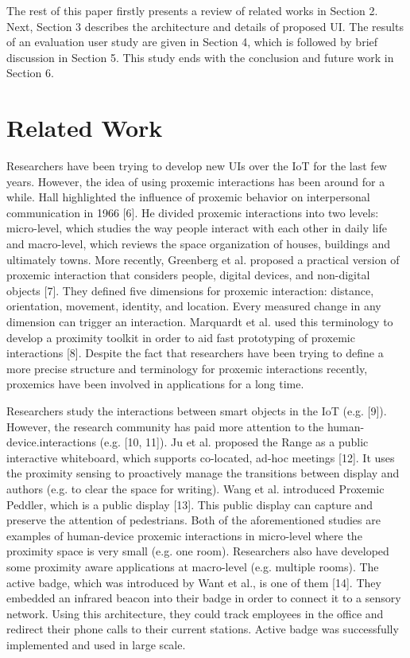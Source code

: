 \documentclass[runningheads,a4paper]{llncs}
\begin{document}
The rest of this paper firstly presents a review of related works in Section
2. Next, Section 3 describes the architecture and details of proposed UI. The
results of an evaluation user study are given in Section 4, which is followed by
brief discussion in Section 5. This study ends with the conclusion and future
work in Section 6.


\section{Related Work}
Researchers have been trying to develop new UIs over the IoT for the last few
years. However, the idea of using proxemic interactions has been around for
a while. Hall highlighted the influence of proxemic behavior on interpersonal
communication in 1966 [6]. He divided proxemic interactions into two levels:
micro-level, which studies the way people interact with each other in daily life
and macro-level, which reviews the space organization of houses, buildings and
ultimately towns. More recently, Greenberg et al. proposed a practical version
of proxemic interaction that considers people, digital devices, and non-digital
objects [7]. They defined five dimensions for proxemic interaction: distance, orientation, movement, identity, and location. Every measured change in any dimension can trigger an interaction. Marquardt et al. used this terminology to
develop a proximity toolkit in order to aid fast prototyping of proxemic interactions [8]. Despite the fact that researchers have been trying to define a more
precise structure and terminology for proxemic interactions recently, proxemics
have been involved in applications for a long time.



Researchers study the interactions between smart objects in the IoT (e.g. [9]). However, the research community has paid more attention to the human-device.interactions (e.g. [10, 11]). Ju et al. proposed the Range as a public interactive
whiteboard, which supports co-located, ad-hoc meetings [12]. It uses the proximity sensing to proactively manage the transitions between display and authors
(e.g. to clear the space for writing). Wang et al. introduced Proxemic Peddler,
which is a public display [13]. This public display can capture and preserve the
attention of pedestrians. Both of the aforementioned studies are examples of
human-device proxemic interactions in micro-level where the proximity space
is very small (e.g. one room). Researchers also have developed some proximity
aware applications at macro-level (e.g. multiple rooms). The active badge, which
was introduced by Want et al., is one of them [14]. They embedded an infrared
beacon into their badge in order to connect it to a sensory network. Using this
architecture, they could track employees in the office and redirect their phone
calls to their current stations. Active badge was successfully implemented and
used in large scale.
\end{document}
